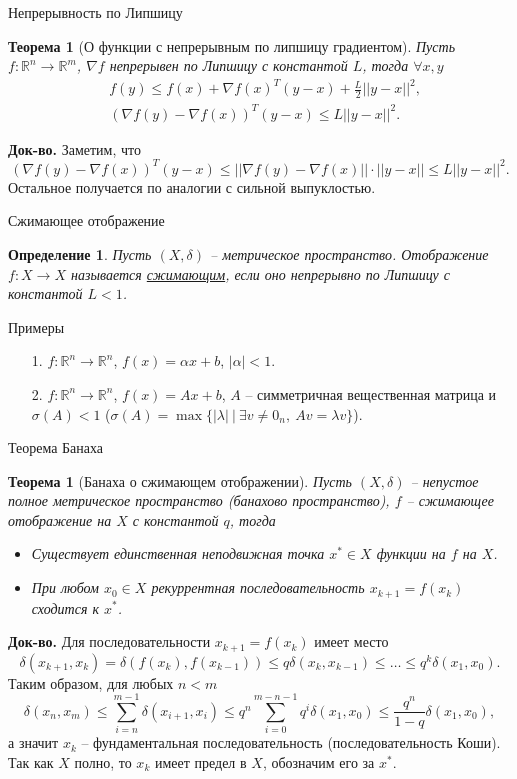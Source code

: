 \documentclass[10pt, handout]{beamer}
\newcounter{thm}
\newcounter{def}
\newtheorem{theorem_ru}[thm]{Теорема}
\newtheorem{definition_ru}{Определение}[def]
\begin{document}
\begin{frame}{Непрерывность по Липшицу}
\begin{theorem_ru}[О функции с непрерывным по липшицу градиентом]
Пусть $f:\mathbb{R}^n\rightarrow \mathbb{R}^m$, $\nabla f$ непрерывен по Липшицу с константой $L$, тогда $\forall x, y$
\begin{align*}
&f(y)\leq f(x)+\nabla f(x)^T(y-x)+\frac{L}{2}||y-x||^2,\\
&(\nabla f(y) - \nabla f(x))^T(y-x)\leq L||y-x||^2.
\end{align*}
\end{theorem_ru}
\pause
\textbf{Док-во.} Заметим, что
$$
(\nabla f(y)-\nabla f(x))^T(y-x)\leq ||\nabla f(y)-\nabla f(x)|| \cdot ||y-x||\leq L||y-x||^2.
$$
\pause
Остальное получается по аналогии с сильной выпуклостью.
\end{frame}

\begin{frame}{Сжимающее отображение}
\begin{definition_ru}
Пусть $(X, \delta)$ -- метрическое пространство. Отображение $f:X\rightarrow X$ называется \underline{сжимающим}, если оно непрерывно по Липшицу с константой $L<1$.
\end{definition_ru}
\pause
Примеры
\begin{itemize}[<+->]
\item[1.] $f:\mathbb{R}^n\rightarrow \mathbb{R}^n$, $f(x)=\alpha x+b$, $|\alpha|<1$.
\item[2.] $f:\mathbb{R}^n\rightarrow \mathbb{R}^n$, $f(x)=Ax+b$, $A$ -- симметричная вещественная матрица и $\sigma(A)<1$ ($\sigma(A)=\max\{|\lambda|~|~\exists v\neq 0_n,~Av=\lambda v\}$). 
\end{itemize}
\end{frame}

\begin{frame}{Теорема Банаха}
\begin{theorem_ru}[Банаха о сжимающем отображении]
Пусть $(X, \delta)$ -- непустое полное метрическое пространство (банахово пространство), $f$ -- сжимающее отображение на $X$ с константой $q$, тогда 
\begin{itemize}
\item Существует единственная неподвижная точка $x^*\in X$ функции на $f$ на $X$.
\item При любом $x_0\in X$ рекуррентная последовательность $x_{k+1}=f(x_k)$ сходится к $x^*$.
\end{itemize} 
\end{theorem_ru}
\pause
\textbf{Док-во.} Для последовательности $x_{k+1}=f(x_k)$ имеет место
$$
\delta(x_{k+1}, x_k)=\delta(f(x_k), f(x_{k-1}))\leq q\delta(x_k, x_{k-1})\leq\ldots\leq q^k\delta(x_1, x_0).
$$
\pause
Таким образом, для любых $n<m$
$$
\delta (x_n, x_m)\leq \sum_{i=n}^{m-1} \delta(x_{i+1}, x_i)\leq q^n\sum_{i=0}^{m-n-1}q^i\delta (x_1, x_0)\leq \frac{q^n}{1-q}\delta(x_1, x_0),
$$
а значит $x_k$ -- фундаментальная последовательность (последовательность Коши). Так как $X$ полно, то $x_k$ имеет предел в $X$, обозначим его за $x^*$.
\end{frame}
\end{document}
